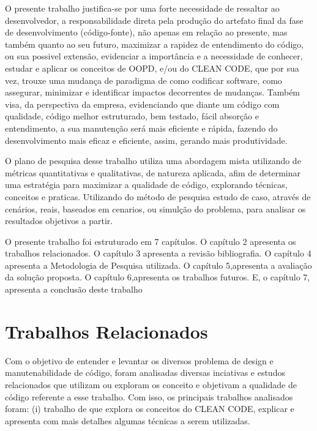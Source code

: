 \documentclass[12pt]{article}
\begin{document}
O presente trabalho justifica-se por uma forte necessidade de ressaltar ao desenvolvedor, a responsabilidade direta pela produção do artefato final da fase de desenvolvimento (código-fonte), não apenas em relação ao presente, mas também quanto ao seu futuro, maximizar a rapidez de entendimento do código, ou sua possivel extensão, evidenciar a importância e a necessidade de conhecer, estudar e aplicar os conceitos de OOPD, e/ou do CLEAN CODE, que por sua vez, trouxe uma mudança de paradigma de como codificar software, como assegurar, minimizar e identificar impactos decorrentes de mudanças.
Também visa, da perspectiva da empresa, evidenciando que diante um código com qualidade, código melhor estruturado, bem testado, fácil absorção e entendimento, a sua manutenção será mais eficiente e rápida, fazendo do desenvolvimento mais eficaz e eficiente, assim, gerando mais produtividade.

O plano de pesquisa desse trabalho utiliza uma abordagem mista utilizando de métricas quantitativas e qualitativas, de natureza aplicada, afim de determinar uma estratégia para maximizar a qualidade de código, explorando técnicas, conceitos e praticas. Utilizando do método de pesquisa estudo de caso, através de cenários, reais, baseados em cenarios, ou simulção do problema, para analisar os resultados objetivos a partir. 

O presente trabalho foi estruturado em 7 capítulos.
O capítulo 2 apresenta os trabalhos relacionados. 
O capítulo 3 apresenta a revisão bibliografia.
O capítulo 4 apresenta a Metodologia de Pesquisa utilizada. 
O capítulo 5,apresenta a avaliação da solução proposta.
O capítulo 6,apresenta os trabalhos futuros.
E, o capítulo 7, apresenta a conclusão deste trabalho

\part{Trabalhos Relacionados} \label{sec:trabalhosrelacionados}

Com o objetivo de entender e levantar os diversos problema de design e manutenabilidade de código, foram analisadas diversas inciativas e estudos relacionados que utilizam ou exploram os conceito e objetivam a qualidade de código referente a esse trabalho.
Com isso, os principais trabalhos analisados foram: (i) trabalho de \cite{TR_CLEAN_CODE_INTRODUCAO} que explora os conceitos do CLEAN CODE, explicar e apresenta com mais detalhes algumas técnicas a serem utilizadas.
\end{document}
